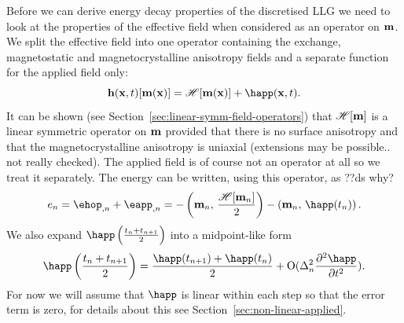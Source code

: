 Before we can derive energy decay properties of the discretised LLG we need to look at the properties of the effective field when considered as an operator on $\mathbf{m}$.
We split the effective field into one operator containing the exchange, magnetostatic and magnetocrystalline anisotropy fields and a separate function for the applied field only:
\begin{equation}
  \label{eq:hop}
  \hv(\xv, t)[\mv(\xv)] = \hop [\mv(\xv)] + \happ(\xv, t).
\end{equation}
It can be shown (see Section~\ref{sec:linear-symm-field-operators}) that $\mathscr{H}[\mathbf{m}]$ is a linear symmetric operator on $\mathbf{m}$ provided that there is no surface anisotropy and that the magnetocrystalline anisotropy is uniaxial (extensions may be possible.. not really checked).
The applied field is of course not an operator at all so we treat it separately. The energy can be written, using this operator, as ??ds why?
\begin{equation}
  \label{eq:energy-hop}
  \e_n = \ehop_{,n} + \eapp_{,n} = - \ip{\mv_n}{\frac{\hop[\mv_n]}{2}} - \ip{\mv_n}{\happ(t_n)}.
\end{equation}
We also expand $\mphapp$ into a midpoint-like form
\begin{equation}
  \mphapp = \frac{\happ(t_{n+1}) + \happ(t_n)}{2} + \order{\dtn^2 \spd{\happ}{t}}.
  \label{eq:happ-midpoint}
\end{equation}
For now we will assume that $\happ$ is linear within each step so that the error term is zero, for details about this see Section~\ref{sec:non-linear-applied}.

